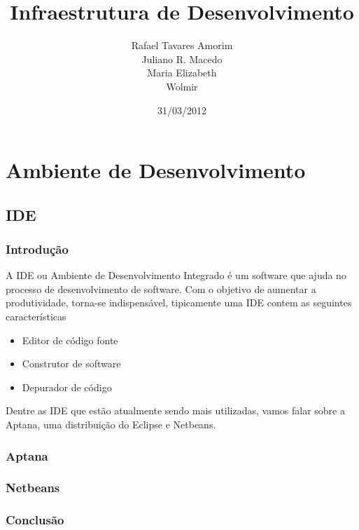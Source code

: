 \documentclass[12pt,a4paper]{article}
\begin{document}
\title{Infraestrutura de Desenvolvimento}
\author{
Rafael Tavares Amorim \\
Juliano R. Macedo \\
Maria Elizabeth \\
Wolmir 
}
\date{31/03/2012}
\maketitle
\thispagestyle{empty}
\clearpage
\tableofcontents
\thispagestyle{empty}
\clearpage
\section{Ambiente de Desenvolvimento}
	\subsection{IDE}
		\subsubsection{Introdução}

				A IDE ou Ambiente de Desenvolvimento Integrado é um software que ajuda no
				processo de desenvolvimento de software. Com o objetivo de aumentar a
				produtividade, torna-se indispensável, tipicamente uma IDE contem as
				seguintes características
				\begin{itemize}
					\item Editor de código fonte
					\item Construtor de software
					\item Depurador de código
				\end{itemize}
				
				Dentre as IDE que estão atualmente sendo mais utilizadas, vamos falar sobre
				a Aptana, uma distribuição do Eclipse e Netbeans.
		
		\subsubsection{Aptana}
		
		\subsubsection{Netbeans}
		
		\subsubsection{Conclusão}
\end{document}
